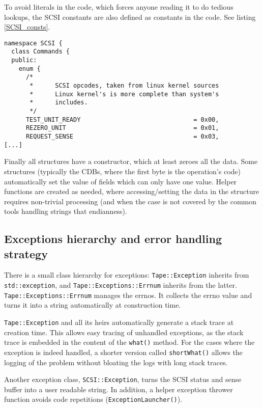 To avoid literals in the code, which forces anyone reading it to do tedious lookups,
the SCSI constants are also defined as constants in the code. See listing \ref{SCSI_consts}.

\begin{table}
\begin{lstlisting}[caption=SCSI::Constants,label=SCSI_consts]
namespace SCSI {
  class Commands {
  public:
    enum {
      /*
       *      SCSI opcodes, taken from linux kernel sources
       *      Linux kernel's is more complete than system's
       *      includes.
       */
      TEST_UNIT_READY                               = 0x00,
      REZERO_UNIT                                   = 0x01,
      REQUEST_SENSE                                 = 0x03,
[...]
\end{lstlisting}
\end{table}

Finally all structures have a constructor, which at least zeroes all the data.
Some structures (typically the CDBs, where the first byte is the operation's code)
automatically set the value of fields which can only have one value. Helper
functions are created as needed, where accessing/setting the data in the structure
requires non-trivial processing (and when the case is not covered by the common
tools handling strings that endianness).

\subsection{Exceptions hierarchy and error handling strategy}

There is a small class hierarchy for exceptions: \verb#Tape::Exception# inherits from
\verb#std::exception#, and \verb#Tape::Exceptions::Errnum# inherits from the latter.
\verb#Tape::Exceptions::Errnum# manages the errnos. It collects the errno value and turns it
into a string automatically at construction time.

\verb#Tape::Exception# and all its heirs automatically generate a stack trace at creation time.
This allows easy tracing of unhandled exceptions, as the stack trace is embedded in the content
of the \verb#what()# method. For the cases where the exception is indeed handled, a shorter version
called \verb#shortWhat()# allows the logging of the problem without bloating the logs with long stack 
traces.

Another exception class, \verb#SCSI::Exception#, turns the SCSI status and sense buffer into a
user readable string. In addition, a helper exception thrower function avoids code
repetitions (\verb#ExceptionLauncher()#).

